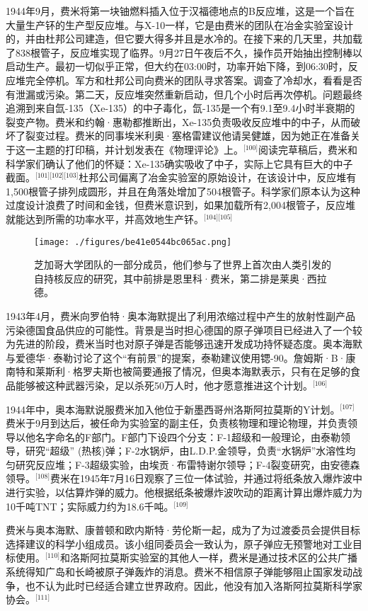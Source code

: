 1944年9月，费米将第一块铀燃料插入位于汉福德地点的B反应堆，这是一个旨在大量生产钚的生产型反应堆。与X-10一样，它是由费米的团队在冶金实验室设计的，并由杜邦公司建造，但它要大得多并且是水冷的。在接下来的几天里，共加载了838根管子，反应堆实现了临界。9月27日午夜后不久，操作员开始抽出控制棒以启动生产。最初一切似乎正常，但大约在03:00时，功率开始下降，到06:30时，反应堆完全停机。军方和杜邦公司向费米的团队寻求答案。调查了冷却水，看看是否有泄漏或污染。第二天，反应堆突然重新启动，但几个小时后再次停机。问题最终追溯到来自氙-135（Xe-135）的中子毒化，氙-135是一个有9.1至9.4小时半衰期的裂变产物。费米和约翰·惠勒都推断出，Xe-135负责吸收反应堆中的中子，从而破坏了裂变过程。费米的同事埃米利奥·塞格雷建议他请吴健雄，因为她正在准备关于这一主题的打印稿，并计划发表在《物理评论》上。\(^\text{[100]}\)阅读完草稿后，费米和科学家们确认了他们的怀疑：Xe-135确实吸收了中子，实际上它具有巨大的中子截面。\(^\text{[101][102][103]}\)杜邦公司偏离了冶金实验室的原始设计，在该设计中，反应堆有1,500根管子排列成圆形，并且在角落处增加了504根管子。科学家们原本认为这种过度设计浪费了时间和金钱，但费米意识到，如果加载所有2,004根管子，反应堆就能达到所需的功率水平，并高效地生产钚。\(^\text{[104][105]}\)
\begin{figure}[ht]
\centering
\texttt{[image: ./figures/be41e0544bc065ac.png]}
\caption{芝加哥大学团队的一部分成员，他们参与了世界上首次由人类引发的自持核反应的研究，其中前排是恩里科·费米，第二排是莱奥·西拉德。} \label{fig_ELK_11}
\end{figure}
1943年4月，费米向罗伯特·奥本海默提出了利用浓缩过程中产生的放射性副产品污染德国食品供应的可能性。背景是当时担心德国的原子弹项目已经进入了一个较为先进的阶段，费米当时也对原子弹是否能够迅速开发成功持怀疑态度。奥本海默与爱德华·泰勒讨论了这个“有前景”的提案，泰勒建议使用锶-90。詹姆斯·B·康南特和莱斯利·格罗夫斯也被简要通报了情况，但奥本海默表示，只有在足够的食品能够被这种武器污染，足以杀死50万人时，他才愿意推进这个计划。\(^\text{[106]}\)

1944年中，奥本海默说服费米加入他位于新墨西哥州洛斯阿拉莫斯的Y计划。\(^\text{[107]}\)费米于9月到达后，被任命为实验室的副主任，负责核物理和理论物理，并负责领导以他名字命名的F部门。F部门下设四个分支：F-1超级和一般理论，由泰勒领导，研究“超级” (热核)弹；F-2水锅炉，由L.D.P.金领导，负责“水锅炉”水溶性均匀研究反应堆；F-3超级实验，由埃贡·布雷特谢尔领导；F-4裂变研究，由安德森领导。\(^\text{[108]}\)费米在1945年7月16日观察了三位一体试验，并通过将纸条放入爆炸波中进行实验，以估算炸弹的威力。他根据纸条被爆炸波吹动的距离计算出爆炸威力为10千吨TNT；实际威力约为18.6千吨。\(^\text{[109]}\)

费米与奥本海默、康普顿和欧内斯特·劳伦斯一起，成为了为过渡委员会提供目标选择建议的科学小组成员。该小组同委员会一致认为，原子弹应无预警地对工业目标使用。\(^\text{[110]}\)和洛斯阿拉莫斯实验室的其他人一样，费米是通过技术区的公共广播系统得知广岛和长崎被原子弹轰炸的消息。费米不相信原子弹能够阻止国家发动战争，也不认为此时已经适合建立世界政府。因此，他没有加入洛斯阿拉莫斯科学家协会。\(^\text{[111]}\)
